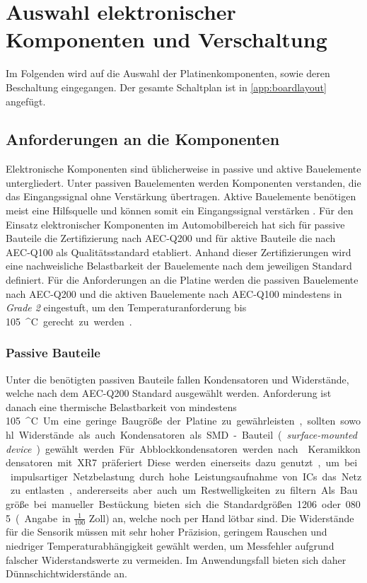 \chapter{Auswahl elektronischer Komponenten und Verschaltung}\label{ch:komp}
Im Folgenden wird auf die Auswahl der Platinenkomponenten, sowie deren Beschaltung eingegangen. Der gesamte Schaltplan ist in \autoref{app:boardlayout} angefügt.
\section{Anforderungen an die Komponenten}
Elektronische Komponenten sind üblicherweise in passive und aktive Bauelemente untergliedert. Unter passiven Bauelementen werden Komponenten verstanden, die das Eingangssignal ohne Verstärkung übertragen. Aktive Bauelemente benötigen meist eine Hilfsquelle und können somit ein Eingangssignal verstärken \cite[S.25]{haendschke}. Für den Einsatz elektronischer Komponenten im Automobilbereich hat sich für passive Bauteile die Zertifizierung nach AEC-Q200 und für aktive Bauteile die nach AEC-Q100 als Qualitätsstandard etabliert. Anhand dieser Zertifizierungen wird eine nachweisliche Belastbarkeit der Bauelemente nach dem jeweiligen Standard definiert. Für die Anforderungen an die Platine werden die passiven Bauelemente nach AEC-Q200 und die aktiven Bauelemente nach AEC-Q100 mindestens in \textit{Grade 2} eingestuft, um den Temperaturanforderung bis \SI{105}{^\circ C} gerecht zu werden \cite[S.6]{aecq}. 
\subsection{Passive Bauteile}
Unter die benötigten passiven Bauteile fallen Kondensatoren und Widerstände, welche nach dem AEC-Q200 Standard ausgewählt werden. Anforderung ist danach eine thermische Belastbarkeit von mindestens \SI{105}{^\circ C}. Um eine geringe Baugröße der Platine zu gewährleisten, sollten sowohl Widerstände als auch Kondensatoren als SMD-Bauteil (\textit{surface-mounted device}) gewählt werden. Für Abblockkondensatoren werden nach \cite[S.7]{ldo} Keramikkondensatoren mit XR7 präferiert. Diese werden einerseits dazu genutzt, um bei impulsartiger Netzbelastung durch hohe Leistungsaufnahme von ICs das Netz zu entlasten, andererseits aber auch um Restwelligkeiten zu filtern. Als Baugröße bei manueller Bestückung bieten sich die Standardgrößen 1206 oder 0805 (Angabe in $\frac{1}{100}$ Zoll) an, welche noch per Hand lötbar sind. Die Widerstände für die Sensorik müssen mit sehr hoher Präzision, geringem Rauschen und niedriger Temperaturabhängigkeit gewählt werden, um Messfehler aufgrund falscher Widerstandswerte zu vermeiden. Im Anwendungsfall bieten sich daher Dünnschichtwiderstände an.
